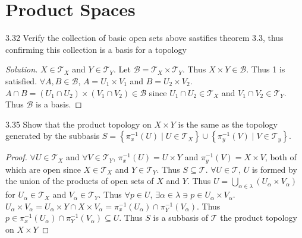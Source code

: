 \documentclass{article}
\newcommand*{\T}{\mathcal{T}}
\newcommand*{\B}{\mathcal{B}}
\newenvironment{solution}
{\renewcommand\qedsymbol{$\blacksquare$}\begin{proof}[Solution]}
{\end{proof}}
\begin{document}
\pagebreak

\section*{Product Spaces}

\begin{PROB}{3.32}\label{Problem 3.32.}
    Verify the collection of basic open sets above sastifies theorem 3.3, thus confirming this collection is a basis for a topology
\end{PROB}
\begin{solution}
    $X \in \T_X$ and $Y \in \T_Y$. Let $\B = \T_X \times \T_Y$. Thus $X \times Y \in \B$. Thus 1 is satisfied. $\forall A, B \in \B$, $A = U_1 \times V_1$ and $B = U_2 \times V_2$. $A \cap B = (U_1 \cap U_2) \times (V_1 \cap V_2) \in \B$ since $U_1 \cap U_2 \in \T_X$ and $V_1 \cap V_2 \in \T_Y$. Thus $\B$ is a basis.            
\end{solution}

\bigskip

\begin{claim}{3.35}\label{Claim 3.35.}
    Show that the product topology on $X \times Y$ is the same as the topology generated by the subbasis $S = \left\{ \pi_x^{-1}(U) \mid U \in \T_X \right\} \cup \left\{ \pi_y^{-1}(V) \mid V \in \T_y \right\}$.  
\end{claim}
\begin{proof}
    $\forall U \in \T_X$ and $\forall V \in \T_Y$, $\pi_x^{-1}(U) = U \times Y$ and $\pi_y^{-1}(V) = X \times V$, both of which are open since $X \in \T_X$ and $Y \in \T_Y$. Thus $S \subseteq \T$. $\forall U \in \T$, $U$ is formed by the union of the products of open sets of $X$ and $Y$. Thus $U = \bigcup_{\alpha \in \lambda}\left(U_\alpha \times V_\alpha\right)$ for $U_\alpha \in \T_X$ and $V_\alpha \in \T_Y$. Thus $\forall p \in U$, $\exists \alpha \in \lambda \ni p \in U_\alpha \times V_\alpha$. $U_\alpha \times V_\alpha = U_\alpha \times Y \cap X \times V_\alpha = \pi_x^{-1}(U_\alpha) \cap \pi_Y^{-1}(V_\alpha)$. Thus $p \in \pi_x^{-1}(U_\alpha) \cap \pi_Y^{-1}(V_\alpha) \subseteq U$. Thus $S$ is a subbasis of $\T$ the product topology on $X \times Y$             
\end{proof}

\bigskip
\end{document}

